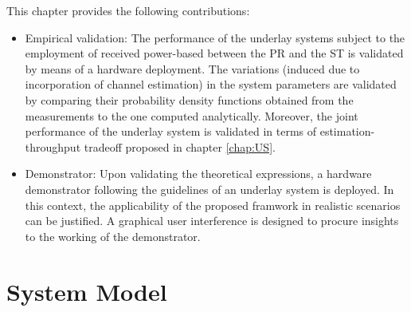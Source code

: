 This chapter provides the following contributions:
\begin{itemize}
	\item Empirical validation: The performance of the underlay systems subject to the employment of received power-based between the PR and the ST is validated by means of a hardware deployment. The variations (induced due to incorporation of channel estimation) in the system parameters are validated by comparing their probability density functions obtained from the measurements to the one computed analytically. Moreover, the joint performance of the underlay system is validated in terms of estimation-throughput tradeoff proposed in chapter \ref{chap:US}. %
	\item Demonstrator: Upon validating the theoretical expressions, a hardware demonstrator following the guidelines of an underlay system is deployed. In this context, the applicability of the proposed framwork in realistic scenarios can be justified. A graphical user interference is designed to procure insights to the working of the demonstrator.	
\end{itemize}



\section{System Model}
\label{sysmod}


